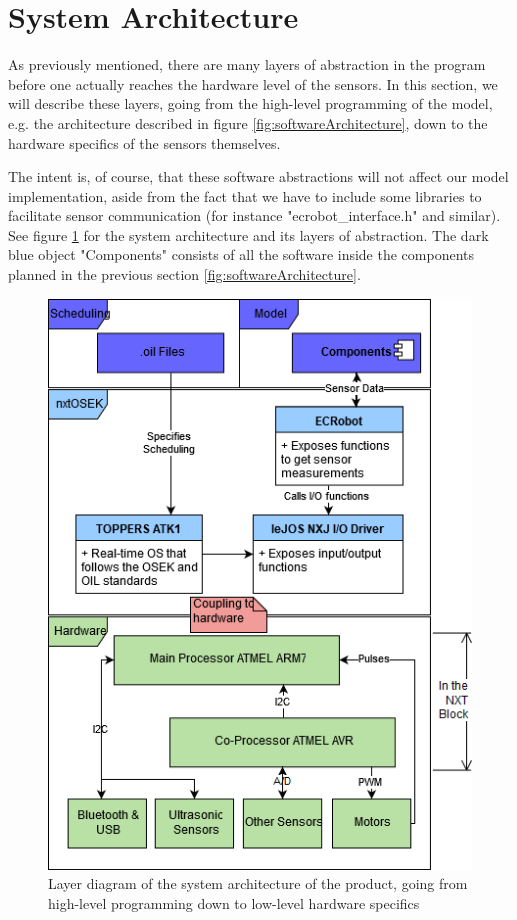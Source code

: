 \section{System Architecture}
As previously mentioned, there are many layers of abstraction in the program before one actually reaches the hardware level of the sensors. In this section, we will describe these layers, going from the high-level programming of the model, e.g. the architecture described in figure \ref{fig:softwareArchitecture}, down to the hardware specifics of the sensors themselves. 

The intent is, of course, that these software abstractions will not affect our model implementation, aside from the fact that we have to include some libraries to facilitate sensor communication (for instance "ecrobot\_interface.h" and similar). See figure \ref{fig:abstractionLayers} for the system architecture and its layers of abstraction. The dark blue object "Components" consists of all the software inside the components planned in the previous section \ref{fig:softwareArchitecture}. 

\begin{figure}[H]
    \includegraphics[width=\textwidth]{Images/Design/abstractionLayerDiagram.png}
    \caption{Layer diagram of the system architecture of the product, going from high-level programming down to low-level hardware specifics}
    \label{fig:abstractionLayers}
\end{figure}


